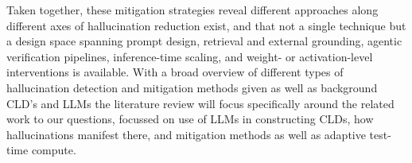 \medskip
Taken together, these mitigation strategies reveal different approaches along different axes of hallucination reduction exist, and that not a single technique but a design space spanning prompt design, retrieval and external grounding, agentic verification pipelines, inference-time scaling, and weight- or activation-level interventions is available. With a broad overview of different types of hallucination detection and mitigation methods given as well as background CLD's and LLMs the literature review will focus specifically around the related work to our questions, focussed on use of LLMs in constructing CLDs, how hallucinations manifest there, and mitigation methods as well as adaptive test-time compute.













